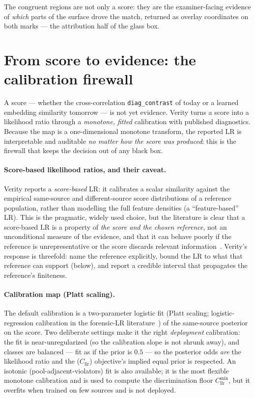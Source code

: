 \documentclass[11pt]{article}
\newcommand{\Cllr}{C_{\mathrm{llr}}}
\newcommand{\Cllrmin}{C_{\mathrm{llr}}^{\min}}
\newcommand{\diagcontrast}{\texttt{diag\_contrast}}
\begin{document}
The congruent regions are not only a score: they are the examiner-facing evidence
of \emph{which} parts of the surface drove the match, returned as overlay
coordinates on both marks --- the attribution half of the glass box.

\section{From score to evidence: the calibration firewall}
\label{sec:calibration}

A score --- whether the cross-correlation \diagcontrast{} of today or a learned
embedding similarity tomorrow --- is not yet evidence. Verity turns a score into a
likelihood ratio through a \emph{monotone, fitted} calibration with published
diagnostics. Because the map is a one-dimensional monotone transform, the reported
LR is interpretable and auditable \emph{no matter how the score was produced}: this
is the firewall that keeps the decision out of any black box.

\paragraph{Score-based likelihood ratios, and their caveat.}
Verity reports a \emph{score-based} LR: it calibrates a scalar similarity against
the empirical same-source and different-source score distributions of a reference
population, rather than modelling the full feature densities (a ``feature-based''
LR). This is the pragmatic, widely used choice, but the literature is clear that a
score-based LR is a property of \emph{the score and the chosen reference}, not an
unconditional measure of the evidence, and that it can behave poorly if the
reference is unrepresentative or the score discards relevant
information~\cite{hepler2012,neumann2020}. Verity's response is threefold: name the
reference explicitly, bound the LR to what that reference can support (below), and
report a credible interval that propagates the reference's finiteness.

\paragraph{Calibration map (Platt scaling).}
The default calibration is a two-parameter logistic fit (Platt scaling;
logistic-regression calibration in the forensic-LR
literature~\cite{morrison2013}) of the same-source posterior on the score. Two deliberate settings make it the right
\emph{deployment} calibration: the fit is near-unregularized (so the calibration
slope is not shrunk away), and classes are balanced --- fit as if the prior is
$0.5$ --- so the posterior odds \emph{are} the likelihood ratio and the
($\Cllr$) objective's implied equal prior is respected. An isotonic
(pool-adjacent-violators) fit is also available; it is the most flexible monotone
calibration and is used to compute the discrimination floor $\Cllrmin$, but it
overfits when trained on few sources and is not deployed.
\end{document}

